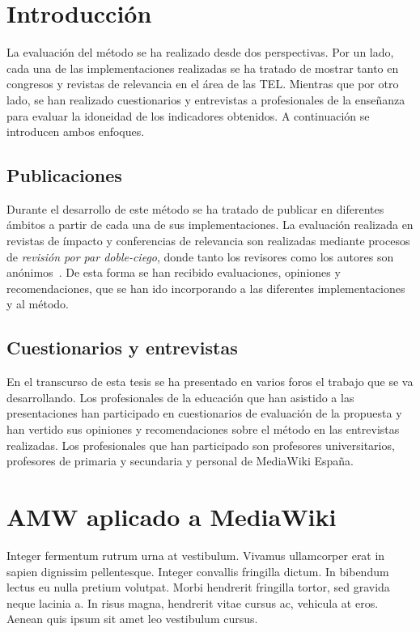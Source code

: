 \section{Introducción}

La evaluación del método se ha realizado desde dos perspectivas. Por un lado, cada una de las implementaciones realizadas se ha tratado de mostrar tanto en congresos y revistas de relevancia en el área de las TEL. Mientras que por otro lado, se han realizado cuestionarios y entrevistas a profesionales de la enseñanza para evaluar la idoneidad de los indicadores obtenidos. A continuación se introducen ambos enfoques.

\subsection{Publicaciones}

Durante el desarrollo de este método se ha tratado de publicar en diferentes ámbitos a partir de cada una de sus implementaciones. La evaluación realizada en revistas de ímpacto y conferencias de relevancia son realizadas mediante procesos de \emph{revisión por par doble-ciego}, donde tanto los revisores como los autores son anónimos~\cite{ladron2008revision}. De esta forma se han recibido evaluaciones, opiniones y recomendaciones, que se han ido incorporando a las diferentes implementaciones y al método.

\subsection{Cuestionarios y entrevistas}

En el transcurso de esta tesis se ha presentado en varios foros el trabajo que se va desarrollando. Los profesionales de la educación que han asistido a las presentaciones han participado en cuestionarios de evaluación de la propuesta y han vertido sus opiniones y recomendaciones sobre el método en las entrevistas realizadas. Los profesionales que han participado son profesores universitarios, profesores de primaria y secundaria y personal de MediaWiki España.

\section{AMW aplicado a MediaWiki}

Integer fermentum rutrum urna at vestibulum. Vivamus ullamcorper erat in sapien dignissim pellentesque. Integer convallis fringilla dictum. In bibendum lectus eu nulla pretium volutpat. Morbi hendrerit fringilla tortor, sed gravida neque lacinia a. In risus magna, hendrerit vitae cursus ac, vehicula at eros. Aenean quis ipsum sit amet leo vestibulum cursus.

